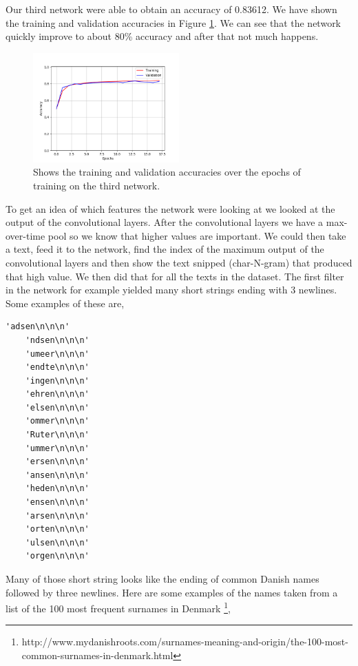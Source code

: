 Our third network were able to obtain an accuracy of 0.83612. We have shown the
training and validation accuracies in Figure \ref{fig:network_3_accuracies}. We
can see that the network quickly improve to about 80\% accuracy and after that
not much happens.

\begin{figure}
    \centering
    \includegraphics[width=0.5\textwidth]{./pictures/experiments/network_3_accuracies.png}
    \caption{Shows the training and validation accuracies over the epochs of
        training on the third network.}
    \label{fig:network_3_accuracies}
\end{figure}

To get an idea of which features the network were looking at we looked at the
output of the convolutional layers. After the convolutional layers we have a
max-over-time pool so we know that higher values are important. We could then
take a text, feed it to the network, find the index of the maximum output of
the convolutional layers and then show the text snipped (char-N-gram) that
produced that high value. We then did that for all the texts in the dataset. The
first filter in the network for example yielded many short strings ending with 3
newlines. Some examples of these are,

\begin{lstlisting}[gobble=4]
    'adsen\n\n\n'
    'ndsen\n\n\n'
    'umeer\n\n\n'
    'endte\n\n\n'
    'ingen\n\n\n'
    'ehren\n\n\n'
    'elsen\n\n\n'
    'ommer\n\n\n'
    'Ruter\n\n\n'
    'ummer\n\n\n'
    'ersen\n\n\n'
    'ansen\n\n\n'
    'heden\n\n\n'
    'ensen\n\n\n'
    'arsen\n\n\n'
    'orten\n\n\n'
    'ulsen\n\n\n'
    'orgen\n\n\n'
\end{lstlisting}

Many of those short string looks like the ending of common Danish
names followed by three newlines. Here are some examples of the
names taken from a list of the 100 most frequent surnames in Denmark
\footnote{http://www.mydanishroots.com/surnames-meaning-and-origin/the-100-most-
common-surnames-in-denmark.html},

